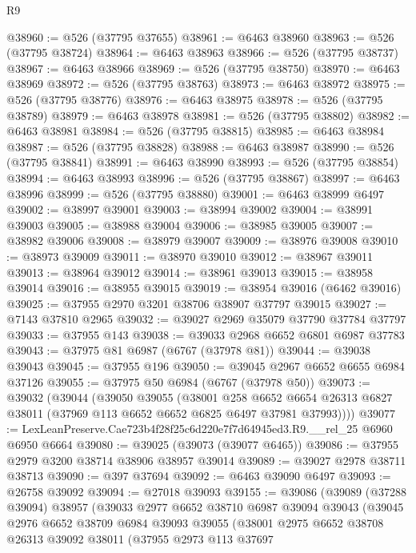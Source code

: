 \begin{lexlean}{R9}
\begin{coremodule}
@38960 := @526 (@37795 @37655)
@38961 := @6463 @38960
@38963 := @526 (@37795 @38724)
@38964 := @6463 @38963
@38966 := @526 (@37795 @38737)
@38967 := @6463 @38966
@38969 := @526 (@37795 @38750)
@38970 := @6463 @38969
@38972 := @526 (@37795 @38763)
@38973 := @6463 @38972
@38975 := @526 (@37795 @38776)
@38976 := @6463 @38975
@38978 := @526 (@37795 @38789)
@38979 := @6463 @38978
@38981 := @526 (@37795 @38802)
@38982 := @6463 @38981
@38984 := @526 (@37795 @38815)
@38985 := @6463 @38984
@38987 := @526 (@37795 @38828)
@38988 := @6463 @38987
@38990 := @526 (@37795 @38841)
@38991 := @6463 @38990
@38993 := @526 (@37795 @38854)
@38994 := @6463 @38993
@38996 := @526 (@37795 @38867)
@38997 := @6463 @38996
@38999 := @526 (@37795 @38880)
@39001 := @6463 @38999 @6497
@39002 := @38997 @39001
@39003 := @38994 @39002
@39004 := @38991 @39003
@39005 := @38988 @39004
@39006 := @38985 @39005
@39007 := @38982 @39006
@39008 := @38979 @39007
@39009 := @38976 @39008
@39010 := @38973 @39009
@39011 := @38970 @39010
@39012 := @38967 @39011
@39013 := @38964 @39012
@39014 := @38961 @39013
@39015 := @38958 @39014
@39016 := @38955 @39015
@39019 := @38954 @39016 (@6462 @39016)
@39025 := @37955 @2970 @3201 @38706 @38907 @37797 @39015
@39027 := @7143 @37810 @2965
@39032 := @39027 @2969 @35079 @37790 @37784 @37797
@39033 := @37955 @143
@39038 := @39033 @2968 @6652 @6801 @6987 @37783
@39043 := @37975 @81 @6987 (@6767 (@37978 @81))
@39044 := @39038 @39043
@39045 := @37955 @196
@39050 := @39045 @2967 @6652 @6655 @6984 @37126
@39055 := @37975 @50 @6984 (@6767 (@37978 @50))
@39073 := @39032
    (@39044
      (@39050
        @39055
        (@38001
          @258
          @6652
          @6654
          @26313
          @6827
          @38011
          (@37969 @113 @6652 @6652 @6825 @6497 @37981 @37993))))
@39077 := LexLeanPreserve.Cae723b4f28f25c6d220e7f7d64945ed3.R9.__rel_25 @6960 @6950 @6664
@39080 := @39025 (@39073 (@39077 @6465))
@39086 := @37955 @2979 @3200 @38714 @38906 @38957 @39014
@39089 := @39027 @2978 @38711 @38713
@39090 := @397 @37694
@39092 := @6463 @39090 @6497
@39093 := @26758 @39092
@39094 := @27018 @39093
@39155 := @39086
    (@39089
      (@37288 @39094)
      @38957
      (@39033
        @2977
        @6652
        @38710
        @6987
        @39094
        @39043
        (@39045
          @2976
          @6652
          @38709
          @6984
          @39093
          @39055
          (@38001
            @2975
            @6652
            @38708
            @26313
            @39092
            @38011
            (@37955
              @2973
              @113
              @37697

\end{coremodule}
\end{lexlean}
